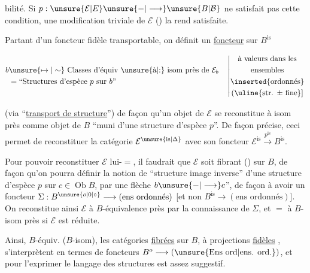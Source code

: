 
bilité. Si \(p:\unsure{\mathcal E|E}\unsure{-|\longrightarrow}\unsure{B|\mathcal B}\) ne satisfait pas cette condition, une modification triviale de \(\mathcal E\) () la rend satisfaite.

Partant d'un foncteur fidèle transportable, on définit  un \uline{foncteur} sur \(B^{\mathrm{is}}\)

\[
\begin{aligned}
b&\unsure{\mapsto|\sim}\text{ Classes d'équiv \unsure{à|:} isom près de }\mathcal E_b\\
 &=\text{``Structures d'espèce }p\text{ sur }b\text{''}
\end{aligned}
\quad\left|\begin{gathered}\text{à valeurs dans les}\\\text{ensembles}\\\inserted{\text{ordonnés}}\\
(\text{\uline{str. \(\pm\) fine}}]\end{gathered}\right.
\]

(via ``\uline{transport de structure}'') de façon qu'un objet de \(\mathcal E\) se reconstitue à isom  près comme objet de \(B\) ``muni d'une structure d'espèce \(p\)''. De façon précise, ceci permet de reconstituer la catégorie \(\mathcal E^{\unsure{\mathrm{is}|\Delta}}\) avec son foncteur \(\mathcal E^{\mathrm{is}}\xrightarrow{p^{\mathrm{is}}}B^{\mathrm{is}}\).

Pour pouvoir reconstituer \(\mathcal E\) lui-\(=\), il faudrait que \(\mathcal E\) soit fibrant () sur \(B\), de façon qu'on pourra définir la notion de ``structure image inverse'' d'une structure d'espèce \(p\) sur \(c\in\operatorname{Ob} B\), par une flèche \(b\unsure{-|\longrightarrow}c\)'', de façon à avoir \inserted{\(=\)} un foncteur \(\Sigma:B^{\unsure{o|0|\circ}}\longrightarrow(\text{ens ordonnés})\) [et non   \(B^{\mathrm{is}}\longrightarrow(\text{ens ordonnés})\)]. On reconstitue ainsi \(\mathcal E\) à \(B\)-équivalence près par la connaissance de \(\Sigma\), et \(=\) à \(B\)-isom près si \(\mathcal E\) est réduite.

Ainsi,  \(B\)-équiv. (\(B\)-isom), les catégories \uline{fibrées} sur \(B\), à projections \uline{fidèles} , s'interprètent en termes de foncteurs  \(B^o\longrightarrow(\unsure{\text{Ens ord}|\text{ens. ord.}})\), et pour l'exprimer le langage des structures est assez suggestif.
